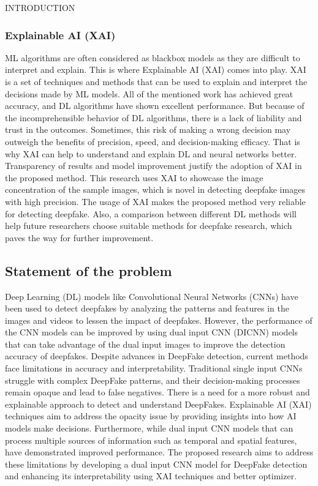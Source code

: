 \begin{section}[]{\uppercase{Introduction}}
    \subsubsection{Explainable AI (XAI)}
    ML algorithms are often considered as blackbox models as they are difficult to interpret and explain. This is where Explainable AI (XAI) comes into play. XAI is a set of techniques and methods that can be used to explain and interpret the decisions made by ML models. \cite{IBMExplainableAI}
    All of the mentioned work has achieved great accuracy, and DL algorithms have shown excellent
    performance. But because of the incomprehensible behavior of DL algorithms, there is a lack of liability
    and trust in the outcomes. Sometimes, this risk of making a wrong decision may outweigh the benefits of
    precision, speed, and decision-making efficacy. That is why XAI can help to understand and explain DL
    and neural networks better. Transparency of results and model improvement justify the adoption of XAI
    in the proposed method.
    This research uses XAI to showcase the image concentration of the sample images, which is novel in
    detecting deepfake images with high precision. The usage of XAI makes the proposed method very
    reliable for detecting deepfake. Also, a comparison between different DL methods will help future
    researchers choose suitable methods for deepfake research, which paves the way for further improvement.

    \subsection{Statement of the problem}
    Deep Learning (DL) models like Convolutional Neural Networks (CNNs) have been used to detect deepfakes by analyzing the patterns and features in the images and videos to lessen the impact of deepfakes. \cite{Tolosana2020}
    However, the performance of the CNN models can be improved by using dual input CNN (DICNN) models that can take advantage of the dual input images to improve the detection accuracy of deepfakes. \cite{Bhandari2023}
    Despite advances in DeepFake detection, current methods face limitations in accuracy and interpretability. Traditional single input CNNs struggle with complex DeepFake patterns, and their decision-making processes remain opaque and lead to false negatives. There is a need for a more robust and explainable approach to detect and understand DeepFakes. Explainable AI (XAI) techniques aim to address the opacity issue by providing insights into how AI models make decisions. Furthermore, while dual input CNN models that can process multiple sources of information such as temporal and spatial features, have demonstrated improved performance.
    The proposed research aims to address these limitations by developing a dual input CNN model for DeepFake detection and enhancing its interpretability using XAI techniques and better optimizer.


\end{section}

